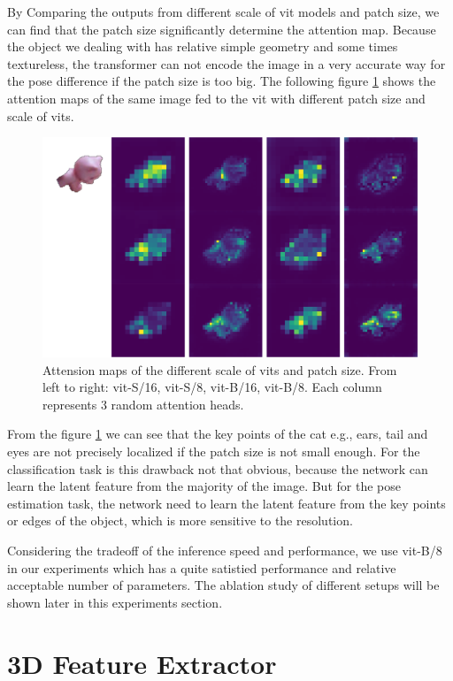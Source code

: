 \documentclass[12pt,DIV14,BCOR12mm,a4paper,footinclude=false,headinclude,parskip=half-,twoside,openright,cleardoublepage=empty,toc=index,bibliography=totoc,listof=totoc]{scrreprt}
\numberwithin{equation}{chapter}
\begin{document}
By Comparing the outputs from different scale of \gls{vit} models and patch size, we can find that the patch size significantly determine the attention map. Because the object we dealing with has relative simple geometry and some times textureless, the transformer can not encode the image in a very accurate way for the pose difference if the patch size is too big. The following figure \ref{img:atten_patch} shows the attention maps of the same image fed to the \gls{vit} with different patch size and scale of \glspl{vit}. 
\begin{figure}[h]
	\centering
	\includegraphics[scale=.65]{img/atten_cat.png}
	\caption{Attension maps of the different scale of \glspl{vit} and patch size. From left to right: \gls{vit}-S/16, \gls{vit}-S/8, \gls{vit}-B/16, \gls{vit}-B/8. Each column represents 3 random attention heads.}
	\label{img:atten_patch}
\end{figure}

From the figure \ref{img:atten_patch} we can see that the key points of the cat e.g., ears, tail and eyes are not precisely localized if the patch size is not small enough. For the classification task is this drawback not that obvious, because the network can learn the latent feature from the majority of the image. But for the pose estimation task, the network need to learn the latent feature from the key points or edges of the object, which is more sensitive to the resolution.

Considering the tradeoff of the inference speed and performance, we use \gls{vit}-B/8 in our experiments which has a quite satistied performance and relative acceptable number of parameters. The ablation study of different setups will be shown later in this experiments section.

\section{3D Feature Extractor}
\end{document}
